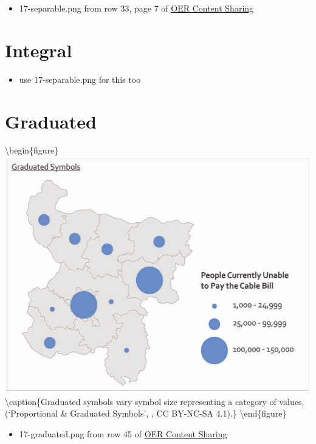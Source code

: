\documentclass[
]{book}
\providecommand{\tightlist}{%
  \setlength{\itemsep}{0pt}\setlength{\parskip}{0pt}}
\begin{document}
\begin{itemize}
\tightlist
\item
  17-separable.png from row 33, page 7 of \href{https://docs.google.com/spreadsheets/d/1LqzXn00wMeIjHWstNT3tMImNDZirLGc3g72jFOQc_8I/edit\#gid=817407192}{OER Content Sharing}
\end{itemize}

\hypertarget{integral}{%
\section{Integral}\label{integral}}

\begin{itemize}
\tightlist
\item
  use 17-separable.png for this too
\end{itemize}

\hypertarget{graduated}{%
\section{Graduated}\label{graduated}}

\textbackslash begin\{figure\}
\includegraphics[width=0.8\linewidth]{images/17-graduated} \textbackslash caption\{Graduated symbols vary symbol size representing a category of values. (`Proportional \& Graduated Symbols', \citet{robinson_layout_2020}, CC BY-NC-SA 4.1).\}\label{fig:17-graduated}
\textbackslash end\{figure\}

\begin{itemize}
\tightlist
\item
  17-graduated.png from row 45 of \href{https://docs.google.com/spreadsheets/d/1LqzXn00wMeIjHWstNT3tMImNDZirLGc3g72jFOQc_8I/edit\#gid=817407192}{OER Content Sharing}
\end{itemize}
\end{document}
